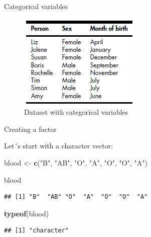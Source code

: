\documentclass[ignorenonframetext,]{beamer}
\newenvironment{Shaded}{\begin{snugshade}}{\end{snugshade}}
\newcommand{\KeywordTok}[1]{\textcolor[rgb]{0.13,0.29,0.53}{\textbf{#1}}}
\newcommand{\NormalTok}[1]{#1}
\newcommand{\StringTok}[1]{\textcolor[rgb]{0.31,0.60,0.02}{#1}}
\begin{document}
\begin{frame}{Categorical variables}
\protect\hypertarget{categorical-variables-2}{}

\begin{figure}
\centering
\includegraphics{figures/dataset.png}
\caption{Dataset with categorical variables}
\end{figure}

\end{frame}

\begin{frame}[fragile]{Creating a factor}
\protect\hypertarget{creating-a-factor}{}

Let´s start with a character vector:

\begin{Shaded}
\begin{Highlighting}[]
\NormalTok{blood <-}\StringTok{ }\KeywordTok{c}\NormalTok{(}\StringTok{"B"}\NormalTok{, }\StringTok{"AB"}\NormalTok{, }\StringTok{"O"}\NormalTok{, }\StringTok{"A"}\NormalTok{, }\StringTok{"O"}\NormalTok{, }\StringTok{"O"}\NormalTok{, }\StringTok{"A"}\NormalTok{) }

\NormalTok{blood}
\end{Highlighting}
\end{Shaded}

\begin{verbatim}
## [1] "B"  "AB" "O"  "A"  "O"  "O"  "A"
\end{verbatim}

\begin{Shaded}
\begin{Highlighting}[]
\KeywordTok{typeof}\NormalTok{(blood)}
\end{Highlighting}
\end{Shaded}

\begin{verbatim}
## [1] "character"
\end{verbatim}

\end{frame}
\end{document}
